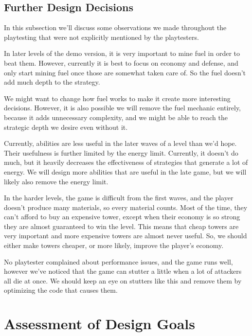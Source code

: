\subsection{Further Design Decisions}

In this subsection we'll discuss some observations we made throughout the playtesting that were not explicitly mentioned by the playtesters.

In later levels of the demo version, it is very important to mine fuel in order to beat them.
However, currently it is best to focus on economy and defense, and only start mining fuel once those are somewhat taken care of.
So the fuel doesn't add much depth to the strategy.

We might want to change how fuel works to make it create more interesting decisions.
However, it is also possible we will remove the fuel mechanic entirely, because it adds unnecessary complexity, and we might be able to reach the strategic depth we desire even without it.

Currently, abilities are less useful in the later waves of a level than we'd hope.
Their usefulness is further limited by the energy limit.
Currently, it doesn't do much, but it heavily decreases the effectiveness of strategies that generate a lot of energy.
We will design more abilities that are useful in the late game, but we will likely also remove the energy limit.

In the harder levels, the game is difficult from the first waves, and the player doesn't produce many materials, so every material counts.
Most of the time, they can't afford to buy an expensive tower, except when their economy is so strong they are almost guaranteed to win the level.
This means that cheap towers are very important and more expensive towers are almost never useful.
So, we should either make towers cheaper, or more likely, improve the player's economy.

No playtester complained about performance issues, and the game runs well, however we've noticed that the game can stutter a little when a lot of attackers all die at once.
We should keep an eye on stutters like this and remove them by optimizing the code that causes them.

\section{Assessment of Design Goals}

